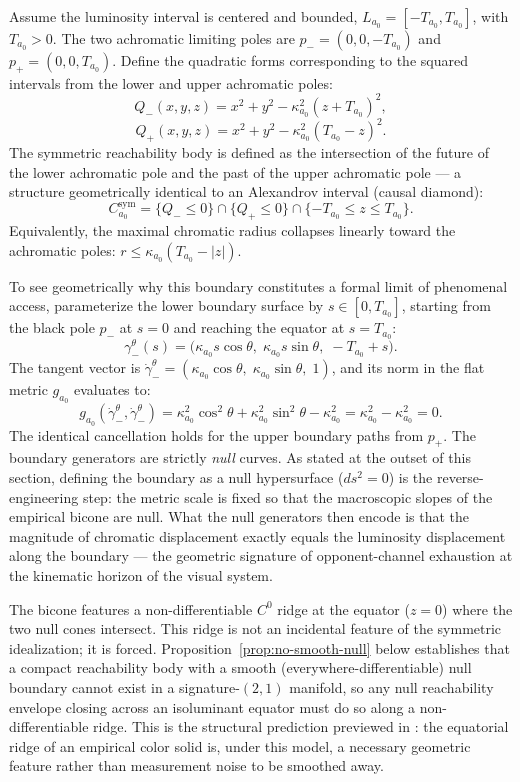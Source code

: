 \documentclass[preprint,12pt,authoryear]{elsarticle}
\theoremstyle{plain}
\theoremstyle{definition}
\theoremstyle{remark}
\begin{document}
Assume the luminosity interval is centered and bounded, $L_{a_0}=[-T_{a_0},T_{a_0}]$, with $T_{a_0}>0$. The two achromatic limiting poles are $p_-=(0,0,-T_{a_0})$ and $p_+=(0,0,T_{a_0})$. Define the quadratic forms corresponding to the squared intervals from the lower and upper achromatic poles:
\[
Q_-(x,y,z)=x^{2}+y^{2}-\kappa_{a_0}^{2}(z+T_{a_0})^{2},
\]
\[
Q_+(x,y,z)=x^{2}+y^{2}-\kappa_{a_0}^{2}(T_{a_0}-z)^{2}.
\]
The symmetric reachability body is defined as the intersection of the future of the lower achromatic pole and the past of the upper achromatic pole --- a structure geometrically identical to an Alexandrov interval (causal diamond):
\[
C_{a_0}^{\mathrm{sym}}
=\{Q_-\leq 0\}\cap\{Q_+\leq 0\}\cap\{-T_{a_0}\leq z\leq T_{a_0}\}.
\]
Equivalently, the maximal chromatic radius collapses linearly toward the achromatic poles: $r\leq\kappa_{a_0}(T_{a_0}-|z|)$.

To see geometrically why this boundary constitutes a formal limit of phenomenal access, parameterize the lower boundary surface by $s\in[0,T_{a_0}]$, starting from the black pole $p_-$ at $s=0$ and reaching the equator at $s=T_{a_0}$:
\[
\gamma_-^{\theta}(s)=
\bigl(\kappa_{a_0}s\cos\theta,\;\kappa_{a_0}s\sin\theta,\;
-T_{a_0}+s\bigr).
\]
The tangent vector is $\dot\gamma_-^{\theta}=(\kappa_{a_0}\cos\theta,\;\kappa_{a_0}\sin\theta,\;1)$, and its norm in the flat metric $g_{a_0}$ evaluates to:
\[
g_{a_0}(\dot\gamma_-^{\theta},\dot\gamma_-^{\theta})
=\kappa_{a_0}^2\cos^2\theta+\kappa_{a_0}^2\sin^2\theta-\kappa_{a_0}^2
=\kappa_{a_0}^2-\kappa_{a_0}^2=0.
\]
The identical cancellation holds for the upper boundary paths from $p_+$. The boundary generators are strictly \emph{null} curves. As stated at the outset of this section, defining the boundary as a null hypersurface ($ds^2=0$) is the reverse-engineering step: the metric scale is fixed so that the macroscopic slopes of the empirical bicone are null. What the null generators then encode is that the magnitude of chromatic displacement exactly equals the luminosity displacement along the boundary --- the geometric signature of opponent-channel exhaustion at the kinematic horizon of the visual system.

The bicone features a non-differentiable $C^0$ ridge at the equator ($z=0$) where the two null cones intersect. This ridge is not an incidental feature of the symmetric idealization; it is forced. Proposition~\ref{prop:no-smooth-null} below establishes that a compact reachability body with a smooth (everywhere-differentiable) null boundary cannot exist in a signature-$(2,1)$ manifold, so any null reachability envelope closing across an isoluminant equator must do so along a non-differentiable ridge. This is the structural prediction previewed in : the equatorial ridge of an empirical color solid is, under this model, a necessary geometric feature rather than measurement noise to be smoothed away.
\end{document}
